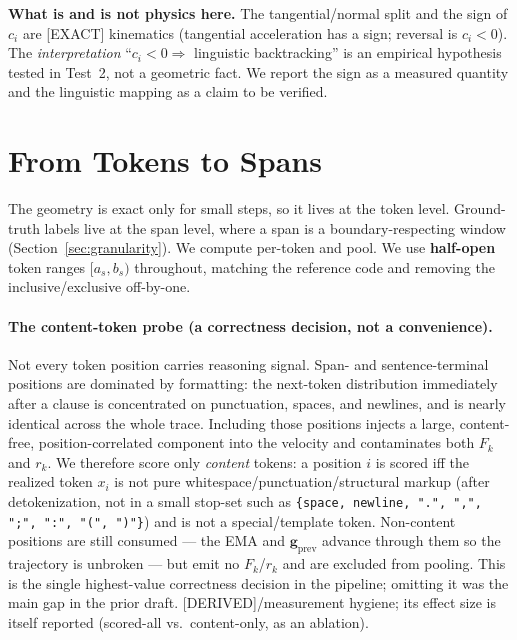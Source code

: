 \documentclass[11pt]{article}
\begin{document}
\begin{honestbox}
\textbf{What is and is not physics here.} The tangential/normal split and the sign of $c_i$ are \textsf{[EXACT]} kinematics (tangential acceleration has a sign; reversal is $c_i<0$). The \emph{interpretation} ``$c_i<0 \Rightarrow$ linguistic backtracking'' is an empirical hypothesis tested in Test~2, not a geometric fact. We report the sign as a measured quantity and the linguistic mapping as a claim to be verified.
\end{honestbox}


\section{From Tokens to Spans}
\label{sec:tokens-to-spans}

The geometry is exact only for small steps, so it lives at the token level. Ground-truth labels live at the span level, where a span is a boundary-respecting window (Section~\ref{sec:granularity}). We compute per-token and pool. We use \textbf{half-open} token ranges $[a_s, b_s)$ throughout, matching the reference code and removing the inclusive/exclusive off-by-one.

\paragraph{The content-token probe (a correctness decision, not a convenience).}
Not every token position carries reasoning signal. Span- and sentence-terminal positions are dominated by formatting: the next-token distribution immediately after a clause is concentrated on punctuation, spaces, and newlines, and is nearly identical across the whole trace. Including those positions injects a large, content-free, position-correlated component into the velocity and contaminates both $F_k$ and $r_k$. We therefore score only \emph{content} tokens: a position $i$ is scored iff the realized token $x_i$ is not pure whitespace/punctuation/structural markup (after detokenization, not in a small stop-set such as \texttt{\{space, newline, ".", ",", ";", ":", "(", ")"\}}) and is not a special/template token. Non-content positions are still consumed --- the EMA and $\bm{g}_{\text{prev}}$ advance through them so the trajectory is unbroken --- but emit no $F_k$/$r_k$ and are excluded from pooling. This is the single highest-value correctness decision in the pipeline; omitting it was the main gap in the prior draft. \textsf{[DERIVED]}/measurement hygiene; its effect size is itself reported (scored-all vs.\ content-only, as an ablation).
\end{document}
